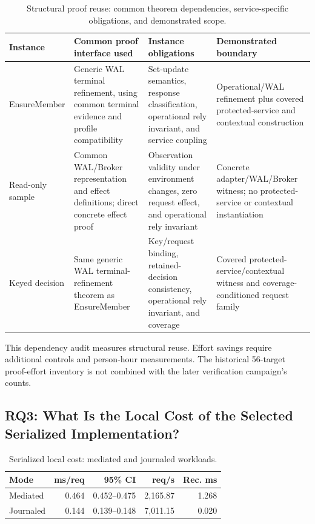 \documentclass[acmsmall,screen,review,anonymous]{acmart}
\begin{document}
\begin{table}[!t]
  \caption{Structural proof reuse: common theorem dependencies,
  service-specific obligations, and demonstrated scope.}
  \label{tab:proof-surface-main}
    \centering
    \small
    \setlength{\tabcolsep}{4pt}
    \begin{tabularx}{\textwidth}{@{}lYYY@{}}
      \toprule
      \textbf{Instance} & \textbf{Common proof interface used}
      & \textbf{Instance obligations} & \textbf{Demonstrated boundary} \\
      \midrule
      EnsureMember
      & Generic WAL terminal refinement, using common terminal evidence
        and profile compatibility
      & Set-update semantics, response classification, operational rely
        invariant, and service coupling
      & Operational/WAL refinement plus covered protected-service and
        contextual construction \\
      Read-only sample
      & Common WAL/Broker representation and effect definitions;
        direct concrete effect proof
      & Observation validity under environment changes, zero request
        effect, and operational rely invariant
      & Concrete adapter/WAL/Broker witness; no protected-service or
        contextual instantiation \\
      Keyed decision
      & Same generic WAL terminal-refinement theorem as EnsureMember
      & Key/request binding, retained-decision consistency, operational
        rely invariant, and coverage
      & Covered protected-service/contextual witness and
        coverage-conditioned request family \\
      \bottomrule
    \end{tabularx}
\end{table}

This dependency audit measures structural reuse. Effort savings require
additional controls and person-hour measurements.
The historical 56-target proof-effort inventory is not combined with
the later verification campaign's counts.

\subsection{RQ3: What Is the Local Cost of the Selected Serialized
Implementation?}

\begin{table}[t]
    \caption{Serialized local cost: mediated and journaled workloads.}
    \label{tab:serialized-local-cost}
    \centering
    \scriptsize
    \setlength{\tabcolsep}{2pt}
    \begin{tabularx}{\linewidth}{@{}Yrrrr@{}}
      \toprule
      \textbf{Mode} & \textbf{ms/req} & \textbf{95\% CI} &
      \textbf{req/s} & \textbf{Rec. ms} \\
      \midrule
      Mediated & 0.464 & 0.452--0.475 & 2,165.87 & 1.268 \\
      Journaled & 0.144 & 0.139--0.148 & 7,011.15 & 0.020 \\
      \bottomrule
    \end{tabularx}
\end{table}
\end{document}
